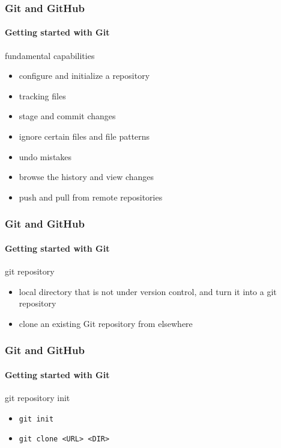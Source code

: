\begin{frame}
    \frametitle{Git and GitHub}
    \framesubtitle{Getting started with Git}
    \addtocounter{nframe}{1}
	
	\begin{block}{fundamental capabilities}
		\begin{itemize}
			\item configure and initialize a repository
			\item tracking files
			\item stage and commit changes
			\item ignore certain files and file patterns
			\item undo mistakes
			\item browse the history and view changes
			\item push and pull from remote repositories
		\end{itemize}
    \end{block}

\end{frame}

\begin{frame}
    \frametitle{Git and GitHub}
    \framesubtitle{Getting started with Git}
    \addtocounter{nframe}{1}
	
	\begin{block}{git repository}
		\begin{itemize}
			\item local directory that is not under version control, and turn it into a git repository
			\item clone an existing Git repository from elsewhere
		\end{itemize}
    \end{block}

\end{frame}

\begin{frame}
    \frametitle{Git and GitHub}
    \framesubtitle{Getting started with Git}
    \addtocounter{nframe}{1}
	
	\begin{block}{git repository init}
		\begin{itemize}
			\item \texttt{git init}
			\item \texttt{git clone <URL> <DIR>}
		\end{itemize}
    \end{block}

\end{frame}

